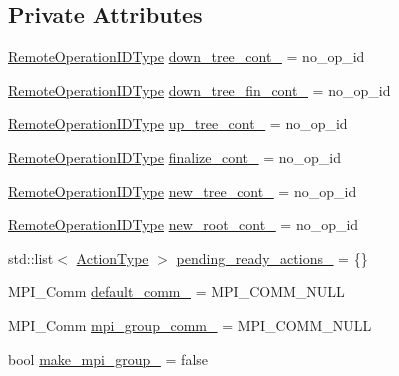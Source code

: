 \subsection*{Private Attributes}
\begin{DoxyCompactItemize}
\item 
\hyperlink{namespacevt_1_1group_a73f2624ddeb535b39a08b6524f26b244}{Remote\+Operation\+I\+D\+Type} \hyperlink{structvt_1_1group_1_1_info_coll_aa6f3626398eb4473b21bfb2a43ba3c96}{down\+\_\+tree\+\_\+cont\+\_\+} = no\+\_\+op\+\_\+id
\item 
\hyperlink{namespacevt_1_1group_a73f2624ddeb535b39a08b6524f26b244}{Remote\+Operation\+I\+D\+Type} \hyperlink{structvt_1_1group_1_1_info_coll_a05eef11154e3dc70bb84c6e3b4c3be6c}{down\+\_\+tree\+\_\+fin\+\_\+cont\+\_\+} = no\+\_\+op\+\_\+id
\item 
\hyperlink{namespacevt_1_1group_a73f2624ddeb535b39a08b6524f26b244}{Remote\+Operation\+I\+D\+Type} \hyperlink{structvt_1_1group_1_1_info_coll_acd4c40fa52015c16a54d9e793cecc700}{up\+\_\+tree\+\_\+cont\+\_\+} = no\+\_\+op\+\_\+id
\item 
\hyperlink{namespacevt_1_1group_a73f2624ddeb535b39a08b6524f26b244}{Remote\+Operation\+I\+D\+Type} \hyperlink{structvt_1_1group_1_1_info_coll_aa767d1c96a39903722351cd0cf758a94}{finalize\+\_\+cont\+\_\+} = no\+\_\+op\+\_\+id
\item 
\hyperlink{namespacevt_1_1group_a73f2624ddeb535b39a08b6524f26b244}{Remote\+Operation\+I\+D\+Type} \hyperlink{structvt_1_1group_1_1_info_coll_a80e7a5ae888fb9e6fae7e078caa773b4}{new\+\_\+tree\+\_\+cont\+\_\+} = no\+\_\+op\+\_\+id
\item 
\hyperlink{namespacevt_1_1group_a73f2624ddeb535b39a08b6524f26b244}{Remote\+Operation\+I\+D\+Type} \hyperlink{structvt_1_1group_1_1_info_coll_a95949a66470f57b28891e904902a3d51}{new\+\_\+root\+\_\+cont\+\_\+} = no\+\_\+op\+\_\+id
\item 
std\+::list$<$ \hyperlink{namespacevt_ae0a5a7b18cc99d7b732cb4d44f46b0f3}{Action\+Type} $>$ \hyperlink{structvt_1_1group_1_1_info_coll_a5e7383d63fbf0b7ab79a5681cb19e421}{pending\+\_\+ready\+\_\+actions\+\_\+} = \{\}
\item 
M\+P\+I\+\_\+\+Comm \hyperlink{structvt_1_1group_1_1_info_coll_a22f10b499eb9a012071bc5c8aeaaec6a}{default\+\_\+comm\+\_\+} = M\+P\+I\+\_\+\+C\+O\+M\+M\+\_\+\+N\+U\+LL
\item 
M\+P\+I\+\_\+\+Comm \hyperlink{structvt_1_1group_1_1_info_coll_a7e16250d8753eaa33c27fbcb62e64e6a}{mpi\+\_\+group\+\_\+comm\+\_\+} = M\+P\+I\+\_\+\+C\+O\+M\+M\+\_\+\+N\+U\+LL
\item 
bool \hyperlink{structvt_1_1group_1_1_info_coll_a1cd784e21b1e11f16eb5359ad8e34ac8}{make\+\_\+mpi\+\_\+group\+\_\+} = false
\end{DoxyCompactItemize}


